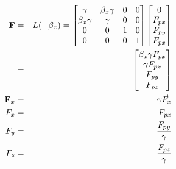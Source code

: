 \documentclass[11pt]{amsart}
\begin{document}
\begin{eqnarray*}
\bold{F} &=& L(-\beta_{x}) = \begin{bmatrix}
	\gamma & \beta_{x}\gamma & 0 & 0 \\
	\beta_{x}\gamma & \gamma & 0 & 0 \\
	0 & 0 & 1 & 0 \\
	0 & 0 & 0 & 1
	\end{bmatrix}\begin{bmatrix}
	0 \\
	F_{px} \\
	F_{py} \\
	F_{px} 
	\end{bmatrix} \\
&=& \begin{bmatrix}
	\beta_{x}\gamma{F_{px}} \\
	\gamma{F_{px}} \\
	F_{py} \\
	F_{pz} 
	\end{bmatrix} \\
\bold{F}_{x} &=& \gamma\vec{F}_{x} \\
F_{x} &=& F_{px} \\
F_{y} &=& \frac{F_{py}}{\gamma} \\
F_{z} &=& \frac{F_{pz}}{\gamma} 
\end{eqnarray*} \\
\end{document}
